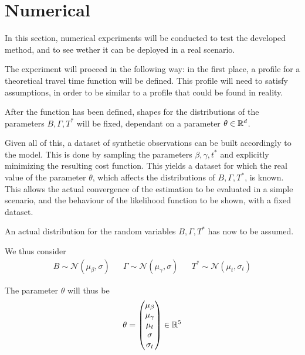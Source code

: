 \section{Numerical}

In this section, numerical experiments will be conducted to test the developed method,
and to see wether it can be deployed in a real scenario.

The experiment will proceed in the following way:
in the first place, a profile for a theoretical travel time function will be defined.
This profile will need to satisfy assumptions,
in order to be similar to a profile that could be found in reality.

After the function has been defined,
shapes for the distributions of the parameters \(B, \Gamma, T^*\) will be fixed,
dependant on a parameter \(\theta \in \mathbb{R}^d\).

Given all of this, a dataset of synthetic observations can be built accordingly to the model.
This is done by sampling the parameters \(\beta, \gamma, t^*\) and explicitly minimizing the resulting cost function.
This yields a dataset for which the real value of the parameter \(\theta\),
which affects the distributions of \(B, \Gamma, T^*\), is known.
This allows the actual convergence of the estimation to be evaluated in a simple scenario,
and the behaviour of the likelihood function to be shown, with a fixed dataset.

An actual distribution for the random variables \(B, \Gamma, T^*\) has now to be assumed.

We thus consider
\begin{align*}
  B \sim \mathcal{N}(\mu_\beta, \sigma) && \Gamma \sim \mathcal{N}(\mu_\gamma, \sigma) && T^* \sim \mathcal{N}(\mu_t, \sigma_t)
\end{align*}

The parameter \(\theta\) will thus be
\begin{equation*}
  \theta =
  \begin{pmatrix}
    \mu_\beta \\
    \mu_\gamma \\
    \mu_t \\
    \sigma \\
    \sigma_t
  \end{pmatrix}
  \in \mathbb{R}^5
\end{equation*}

